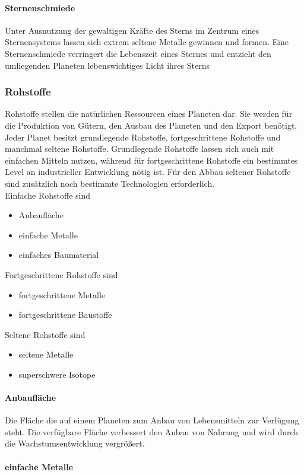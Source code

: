 \documentclass[11pt, a4paper]{article}
\begin{document}
\paragraph{Sternenschmiede}
Unter Ausnutzung der gewaltigen Kräfte des Sterns im Zentrum eines Sternensystems lassen sich extrem seltene
Metalle gewinnen und formen. Eine Sternenschmiede verringert die Lebenszeit eines Sternes und entzieht den
umliegenden Planeten lebenswichtiges Licht ihres Sterns
%
\subsubsection{Rohstoffe}
Rohstoffe stellen die natürlichen Ressourcen eines Planeten dar. Sie werden für die Produktion von Gütern,
den Ausbau des Planeten und den Export benötigt. Jeder Planet besitzt grundlegende Rohstoffe, fortgeschrittene
Rohstoffe und manchmal seltene Rohstoffe. Grundlegende Rohstoffe lassen sich auch mit einfachen Mitteln
nutzen, während für fortgeschrittene Rohstoffe ein bestimmtes Level an industrieller Entwicklung nötig ist.
Für den Abbau seltener Rohstoffe sind zusätzlich noch bestimmte Technologien erforderlich.
\\
Einfache Rohstoffe sind
\begin{itemize}
    \item Anbaufläche
    \item einfache Metalle
    \item einfaches Baumaterial
\end{itemize}
%
Fortgeschrittene Rohstoffe sind
\begin{itemize}
    \item fortgeschrittene Metalle
    \item fortgeschrittene Baustoffe
\end{itemize}
%
Seltene Rohstoffe sind
\begin{itemize}
    \item seltene Metalle
    \item superschwere Isotope
\end{itemize}
%
\paragraph{Anbaufläche}
Die Fläche die auf einem Planeten zum Anbau von Lebensmitteln zur Verfügung steht. Die verfügbare Fläche
verbessert den Anbau von Nahrung und wird durch die Wachstumsentwicklung vergrößert.
%
\paragraph{einfache Metalle}
%
\end{document}
